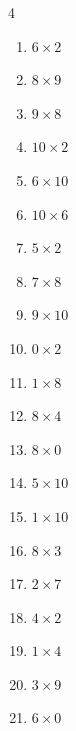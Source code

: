 \begin{multicols}{4}
\begin{enumerate}
  \item $6\times 2$
        \phantom{$=12$}

  \item $8\times 9$
        \phantom{$=72$}

  \item $9\times 8$
        \phantom{$=72$}

  \item $10\times 2$
        \phantom{$=20$}

  \item $6\times 10$
        \phantom{$=60$}

  \item $10\times 6$
        \phantom{$=60$}

  \item $5\times 2$
        \phantom{$=10$}

  \item $7\times 8$
        \phantom{$=56$}

  \item $9\times 10$
        \phantom{$=90$}

  \item $0\times 2$
        \phantom{$=0$}

  \item $1\times 8$
        \phantom{$=8$}

  \item $8\times 4$
        \phantom{$=32$}

  \item $8\times 0$
        \phantom{$=0$}

  \item $5\times 10$
        \phantom{$=50$}

  \item $1\times 10$
        \phantom{$=10$}

  \item $8\times 3$
        \phantom{$=24$}

  \item $2\times 7$
        \phantom{$=14$}

  \item $4\times 2$
        \phantom{$=8$}

  \item $1\times 4$
        \phantom{$=4$}

  \item $3\times 9$
        \phantom{$=27$}

  \item $6\times 0$
        \phantom{$=0$}


\end{enumerate}
\end{multicols}
